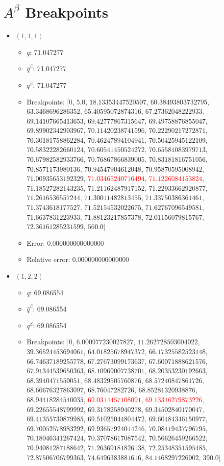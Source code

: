 \documentclass{article}%
\begin{document}
\section{$A^\beta$ Breakpoints}%
\thispagestyle{plain}%
\begin{itemize}%
	\item $(1, 1, 1)$%
	\begin{itemize}%
		\item $q$: 71.047277%
		\item $\hat{q}^\beta$: 71.047277%
		\item $q^\beta$: 71.047277%
		\item Breakpoints: $[$$0$, $5.0$, $18.13353447520507$, $60.38493803732795$, $63.3468696286352$, $65.40595072874316$, $67.27362048222933$, $69.14107665413653$, $69.42777867315647$, $69.49758876855047$, $69.89902342903967$, $70.11420238741596$, $70.22290217272871$, $70.30181758862284$, $70.46247894104941$, $70.50425945122109$, $70.58322282660124$, $70.60541450524272$, $70.65581083979713$, $70.67982582933766$, $70.76867866839005$, $70.83181816751056$, $70.8571173980136$, $70.94547904612048$, $70.95870595008942$, $71.00935653192329$, \textcolor{red}{$71.03465240716494$}, \textcolor{red}{$71.1226084153824$}, $71.18527282143235$, $71.21162487917152$, $71.22933662920877$, $71.2616536557244$, $71.30011482813455$, $71.33750386361461$, $71.3743618177527$, $71.52154532022675$, $71.62767096549581$, $71.6637831223933$, $71.88123217857378$, $72.01156079815767$, $72.36161285231599$, $560.0$$]$%
		\item Error: 0.000000000000000%
		\item Relative error: 0.000000000000000%
	\end{itemize}%
	\item $(1, 2, 2)$%
	\begin{itemize}%
		\item $q$: 69.086554%
		\item $\hat{q}^\beta$: 69.086554%
		\item $q^\beta$: 69.086554%
		\item Breakpoints: $[$$0$, $6.000977230027827$, $11.262728503004022$, $39.36524453694061$, $64.01825678947372$, $66.17325582523148$, $66.74637189255778$, $67.27673099173637$, $67.60071888621576$, $67.91344539650363$, $68.10969007738701$, $68.20353230192663$, $68.3940471550051$, $68.48329505760876$, $68.57240847861726$, $68.66676327863097$, $68.76047282726$, $68.85281320938876$, $68.94418284540035$, \textcolor{red}{$69.0314457108091$}, \textcolor{red}{$69.13316279873226$}, $69.22655548799992$, $69.3178258940278$, $69.34502840170047$, $69.41355730879985$, $69.51025044804472$, $69.60484346150977$, $69.70052578983292$, $69.93657924014246$, $70.08419437796795$, $70.18046341267424$, $70.37078617087542$, $70.56626459266522$, $70.94081287188642$, $71.26369181826138$, $72.25348351595485$, $72.87506706799363$, $74.6496383881616$, $84.1468297226002$, $390.0$$]$%

\end{itemize}
\end{itemize}
\end{document}
